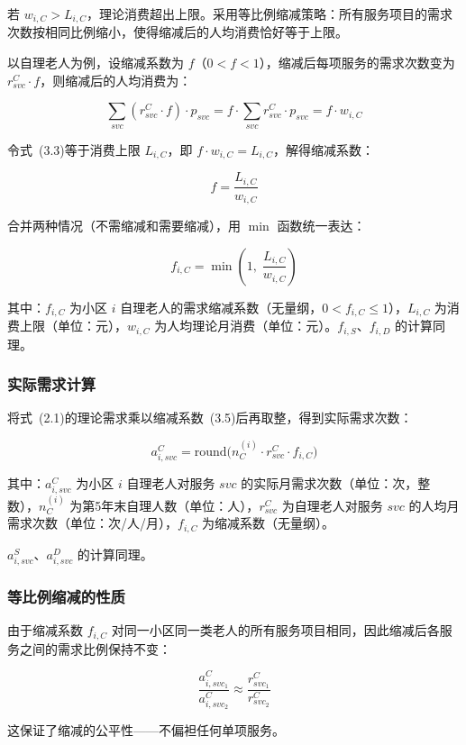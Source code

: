 \documentclass[12pt,a4paper]{article}
\begin{document}
若 $w_{i,C} > L_{i,C}$，理论消费超出上限。采用等比例缩减策略：所有服务项目的需求次数按相同比例缩小，使得缩减后的人均消费恰好等于上限。

以自理老人为例，设缩减系数为 $f$（$0 < f < 1$），缩减后每项服务的需求次数变为 $r_{svc}^C \cdot f$，则缩减后的人均消费为：

\begin{equation}
\sum_{svc} (r_{svc}^C \cdot f) \cdot p_{svc}
= f \cdot \sum_{svc} r_{svc}^C \cdot p_{svc}
= f \cdot w_{i,C}
\tag{3.3}
\end{equation}

令式~(3.3)等于消费上限 $L_{i,C}$，即 $f \cdot w_{i,C} = L_{i,C}$，解得缩减系数：

\begin{equation}
f = \frac{L_{i,C}}{w_{i,C}}
\tag{3.4}
\end{equation}

合并两种情况（不需缩减和需要缩减），用 $\min$ 函数统一表达：

\begin{equation}
f_{i,C} = \min\left(1,\; \frac{L_{i,C}}{w_{i,C}}\right)
\tag{3.5}
\end{equation}

其中：$f_{i,C}$ 为小区 $i$ 自理老人的需求缩减系数（无量纲，$0 < f_{i,C} \leq 1$），$L_{i,C}$ 为消费上限（单位：元），$w_{i,C}$ 为人均理论月消费（单位：元）。$f_{i,S}$、$f_{i,D}$ 的计算同理。

\subsubsection{实际需求计算}

将式~(2.1)的理论需求乘以缩减系数~(3.5)后再取整，得到实际需求次数：

\begin{equation}
a_{i,svc}^C = \text{round}\bigl(n_C^{(i)} \cdot r_{svc}^C \cdot f_{i,C}\bigr)
\tag{3.6}
\end{equation}

其中：$a_{i,svc}^C$ 为小区 $i$ 自理老人对服务 $svc$ 的实际月需求次数（单位：次，整数），$n_C^{(i)}$ 为第5年末自理人数（单位：人），$r_{svc}^C$ 为自理老人对服务 $svc$ 的人均月需求次数（单位：次/人/月），$f_{i,C}$ 为缩减系数（无量纲）。

$a_{i,svc}^S$、$a_{i,svc}^D$ 的计算同理。

\subsubsection{等比例缩减的性质}

由于缩减系数 $f_{i,C}$ 对同一小区同一类老人的所有服务项目相同，因此缩减后各服务之间的需求比例保持不变：

\begin{equation}
\frac{a_{i,svc_1}^C}{a_{i,svc_2}^C}
\approx \frac{r_{svc_1}^C}{r_{svc_2}^C}
\tag{3.7}
\end{equation}

这保证了缩减的公平性——不偏袒任何单项服务。
\end{document}
